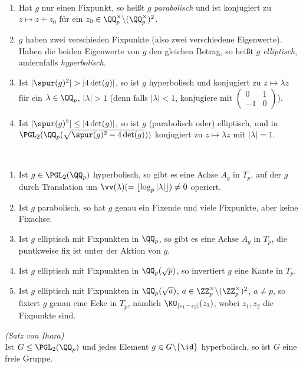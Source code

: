 \DB\ \begin{enumerate}
\item Hat $g$ nur einen Fixpunkt, so heißt $g$
\emph{parabolisch} und ist konjugiert zu
$z\mapsto z+z_0$ für ein
$z_0\in\QQ_p^\times\backslash(\QQ_p^\times)^2$.
\item $g$ haben zwei verschieden Fixpunkte (also zwei
verschiedene Eigenwerte).
Haben die beiden Eigenwerte von $g$ den gleichen Betrag, so
heißt $g$ \emph{elliptisch}, andernfalls
\emph{hyperbolisch}.
\item Ist $|\spur(g)^2|>|4\det(g)|$, so ist $g$
hyperbolisch und konjugiert zu $z\mapsto\lambda z$ für ein
$\lambda\in\QQ_p$, $|\lambda|>1$ (denn falls $|\lambda|<1$,
konjugiere mit $\begin{pmatrix}0&1\\ -1&0\end{pmatrix}$).
\item Ist $|\spur(g)^2|\leq |4\det(g)|$, so ist $g$
(parabolisch oder) elliptisch, und in\\
$\PGL_2(\QQ_p(\sqrt{\spur(g)^2-4\det(g)}))$ konjugiert
zu $z\mapsto \lambda z$ mit $|\lambda|=1$.
\end{enumerate}

\BEM\ \label{bem_hep}
\begin{enumerate}
\item Ist $g\in\PGL_2(\QQ_p)$ hyperbolisch, so gibt es eine
Achse $A_g$ in $T_p$, auf der $g$ durch Translation um
$\vv(\lambda)(=\lfloor\log_p|\lambda|\rfloor)\neq 0$ operiert.
\item Ist $g$ parabolisch, so hat $g$ genau ein Fixende
und viele Fixpunkte, aber keine Fixachse.
\item Ist $g$ elliptisch mit Fixpunkten in $\QQ_p$, so gibt es
eine Achse $A_g$ in $T_p$, die puntkweise fix ist unter
der Aktion von $g$.
\item Ist $g$ elliptisch mit Fixpunkten in $\QQ_p(\sqrt{p})$,
so invertiert $g$ eine Kante in $T_p$.
\item Ist $g$ elliptisch mit Fixpunkten in $\QQ_p(\sqrt{a})$,
$a\in\ZZ_p^\times\backslash(\ZZ_p^\times)^2$, $a\neq p$,
so fixiert $g$
genau eine Ecke in $T_p$, nämlich $\KU_{|z_1-z_2|}(z_1)$, wobei
$z_1, z_2$ die Fixpunkte sind.
\end{enumerate}

\SATZ\label{satz_ihara} \emph{(Satz von Ihara)}\\
Ist $G\leq\PGL_2(\QQ_p)$ und jedes Element
$g\in G\backslash\{\id\}$ hyperbolisch,
so ist $G$ eine freie Gruppe.

